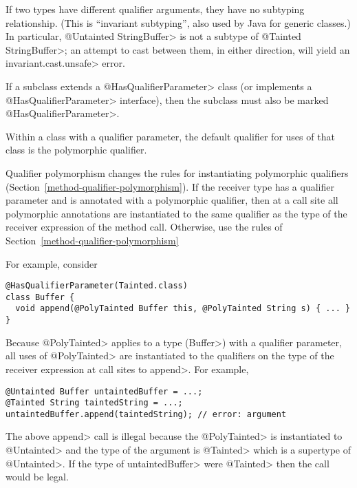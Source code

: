 If two types have different qualifier arguments, they have no subtyping
relationship.  (This is ``invariant subtyping'', also used by Java for
generic classes.)  In particular, \<@Untainted StringBuffer> is not a
subtype of \<@Tainted StringBuffer>; an attempt to cast between them, in
either direction, will yield an \<invariant.cast.unsafe> error.

If a subclass extends a \<@HasQualifierParameter> class (or implements a
\<@HasQualifierParameter> interface), then the subclass must also be marked
\<@HasQualifierParameter>.


Within a class with a qualifier parameter,
the default qualifier for uses of that class is the polymorphic qualifier.



Qualifier polymorphism changes the rules for instantiating polymorphic
qualifiers (Section~\ref{method-qualifier-polymorphism}).
If the receiver type has a qualifier parameter and is annotated with a polymorphic qualifier,
then at a call site all polymorphic annotations are instantiated to
the same qualifier as the type of the receiver expression of the method call.
Otherwise, use the rules of Section~\ref{method-qualifier-polymorphism}

For example, consider

\begin{Verbatim}
@HasQualifierParameter(Tainted.class)
class Buffer {
  void append(@PolyTainted Buffer this, @PolyTainted String s) { ... }
}
\end{Verbatim}

\noindent
Because \<@PolyTainted> applies to a type (\<Buffer>) with a qualifier parameter, all
uses of \<@PolyTainted> are instantiated to the qualifiers on the type of
the receiver expression at call sites to \<append>. For example,

\begin{Verbatim}
@Untainted Buffer untaintedBuffer = ...;
@Tainted String taintedString = ...;
untaintedBuffer.append(taintedString); // error: argument
\end{Verbatim}
The above \<append> call is illegal because the \<@PolyTainted> is instantiated to \<@Untainted> and
the type of the argument is \<@Tainted> which is a supertype of \<@Untainted>.  If the type of
\<untaintedBuffer> were \<@Tainted> then the call would be legal.

